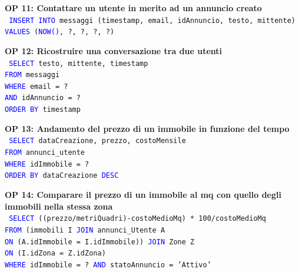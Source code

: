 \documentclass[a4paper,12pt]{report}
\begin{document}
            \noindent
            \textbf{OP 11: Contattare un utente in merito ad un annuncio creato} \\
            \texttt{
                \textcolor{blue}{INSERT INTO} messaggi (timestamp, email, idAnnuncio, testo, mittente) \\
                \textcolor{blue}{VALUES} (\textcolor{blue}{NOW()}, ?, ?, ?, ?) \\
            } 

            \noindent
            \textbf{OP 12: Ricostruire una conversazione tra due utenti} \\
            \texttt{
                \textcolor{blue}{SELECT} testo, mittente, timestamp \\
                \textcolor{blue}{FROM} messaggi \\
                \textcolor{blue}{WHERE} email = ? \\
                \textcolor{blue}{AND} idAnnuncio = ? \\
                \textcolor{blue}{ORDER BY} timestamp \\
            }

            \noindent
            \textbf{OP 13: Andamento del prezzo di un immobile in funzione del tempo} \\
            \texttt{
                \textcolor{blue}{SELECT} dataCreazione, prezzo, costoMensile \\
                \textcolor{blue}{FROM} annunci\_utente \\
                \textcolor{blue}{WHERE} idImmobile = ? \\
                \textcolor{blue}{ORDER BY} dataCreazione \textcolor{blue}{DESC} \\
            }
            
            \noindent
            \textbf{OP 14: Comparare il prezzo di un immobile al mq con quello degli immobili nella stessa zona} \\
            \texttt{
                \textcolor{blue}{SELECT} ((prezzo/metriQuadri)-costoMedioMq) * 100/costoMedioMq \\
                \textcolor{blue}{FROM} (immobili I \textcolor{blue}{JOIN} annunci\_Utente A  \\
                \textcolor{blue}{ON} (A.idImmobile = I.idImmobile)) \textcolor{blue}{JOIN} Zone Z \\
                \textcolor{blue}{ON} (I.idZona = Z.idZona) \\
                \textcolor{blue}{WHERE} idImmobile = ? \textcolor{blue}{AND} statoAnnuncio = 'Attivo' \\
            }
            
\end{document}
